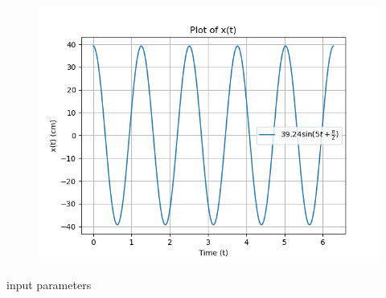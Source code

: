 \documentclass[journal,12pt,twocolumn]{IEEEtran}
\theoremstyle{remark}
\begin{document}
 \begin{figure}[h!]
    \centering
    \includegraphics[width = \columnwidth]{figs/xe_71_f2.png}
\end{figure}
 \begin{table}[!ht]
    \centering
        
    \caption{input parameters}
     \label{XE 71.t1}
\end{table}
\end{document}
